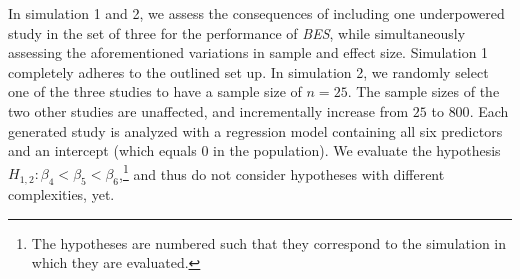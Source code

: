\documentclass[
]{interact}
\begin{document}
                    In simulation 1 and 2, we assess the consequences of including one
                    underpowered study in the set of three for the performance of
                    \emph{BES}, while simultaneously assessing the aforementioned variations
                    in sample and effect size. Simulation 1 completely adheres to the
                    outlined set up. In simulation 2, we randomly select one of the three
                    studies to have a sample size of \(n = 25\). The sample sizes of the two
                    other studies are unaffected, and incrementally increase from \(25\) to
                    \(800\). Each generated study is analyzed with a regression model
                    containing all six predictors and an intercept (which equals 0 in the
                                                                    population). We evaluate the hypothesis
                    \(H_{1,2}: \beta_4 < \beta_5 < \beta_6\),\footnote{ The hypotheses are
                      numbered such that they correspond to the simulation in which they are
                      evaluated.} and thus do not consider hypotheses with different
                    complexities, yet.
                    
\end{document}
